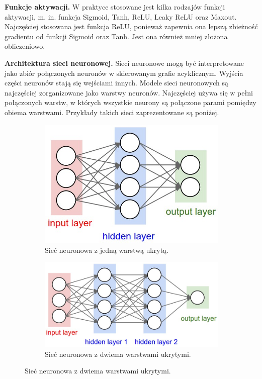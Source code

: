 \documentclass[a4paper,11pt, notitlepage, twosides, openany ]{report}
\begin{document}
	\textbf{Funkcje aktywacji.} W praktyce stosowane jest kilka rodzajów funkcji aktywacji, m. in. funkcja Sigmoid, Tanh, ReLU, Leaky ReLU oraz Maxout. Najczęściej stosowana jest funkcja ReLU, ponieważ zapewnia ona lepszą zbieżność gradientu od funkcji Sigmoid oraz Tanh. Jest ona również mniej złożona obliczeniowo.

	\textbf{Architektura sieci neuronowej.} Sieci neuronowe mogą być interpretowane jako zbiór połączonych neuronów w skierowanym grafie acyklicznym. Wyjścia części neuronów stają się wejściami innych. Modele sieci neuronowych są najczęściej zorganizowane jako warstwy neuronów. Najczęściej używa się w pełni połączonych warstw, w których wszystkie neurony są połączone parami pomiędzy obiema warstwami. Przykłady takich sieci zaprezentowane są poniżej.

	\begin{figure}[h!]
        \centering
        \begin{subfigure}{.5\textwidth}
          \centering
          \includegraphics[width=.95\linewidth]{neural_net.jpeg}
          \caption{Sieć neuronowa z jedną warstwą ukrytą.}
          \label{fig:sub1}
        \end{subfigure}%
        \begin{subfigure}{.5\textwidth}
          \centering
          \includegraphics[width=0.95\linewidth]{neural_net2.jpeg}
          \caption{Sieć neuronowa z dwiema warstwami ukrytymi.}
          \label{fig:sub2}
        \end{subfigure}
        \label{fig:vs}
	\end{figure}
\end{document}
